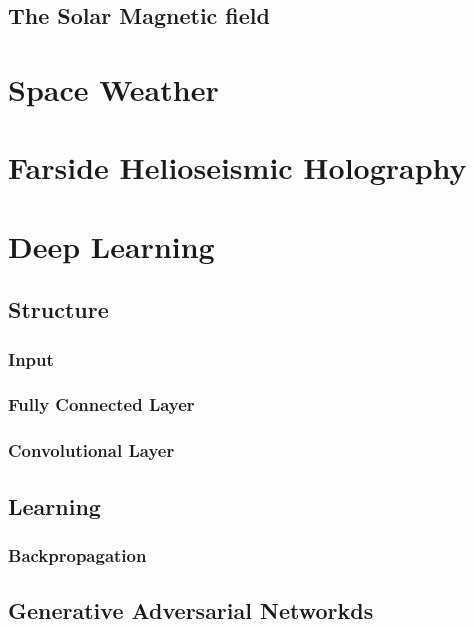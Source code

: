 \documentclass[11pt,a4paper,onecolumn]{report}
\begin{document}
%
\subsection{The Solar Magnetic field}
%
\label{sec:solar magnetic field}


%
%
\section{Space Weather}
%
%



%
%
\section{Farside Helioseismic Holography}
%
%




%
%
\section{Deep Learning}
%
%

%
\subsection{Structure}
%

\subsubsection*{Input}

\subsubsection*{Fully Connected Layer}

\subsubsection*{Convolutional Layer}



%
\subsection{Learning}
%

\subsubsection*{Backpropagation}


%
\subsection{Generative Adversarial Networkds}
%
\end{document}
